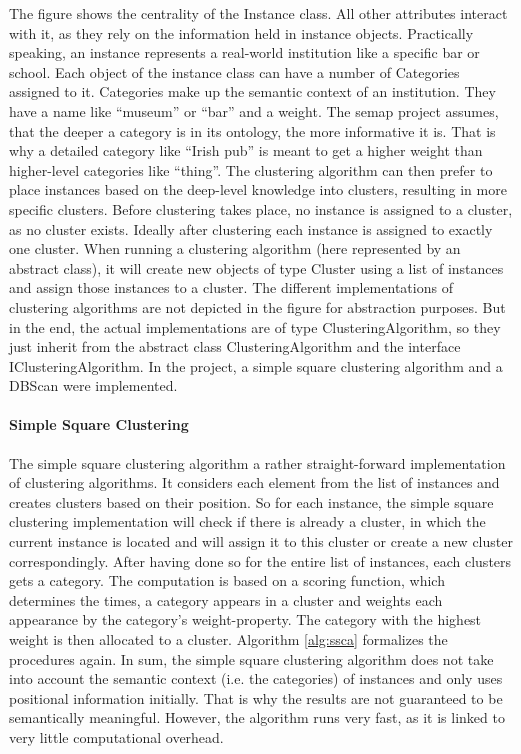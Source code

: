 The figure shows the centrality of the Instance class. All other attributes interact with it, as they rely on the information held in instance objects. Practically speaking, an instance represents a real-world institution like a specific bar or school. Each object of the instance class can have a number of Categories assigned to it. Categories make up the semantic context of an institution. They have a name like “museum” or “bar” and a weight. The semap project assumes, that the deeper a category is in its ontology, the more informative it is. That is why a detailed category like “Irish pub” is meant to get a higher weight than higher-level categories like “thing”. The clustering algorithm can then prefer to place instances based on the deep-level knowledge into clusters, resulting in more specific clusters.
Before clustering takes place, no instance is assigned to a cluster, as no cluster exists. Ideally after clustering each instance is assigned to exactly one cluster. When running a clustering algorithm (here represented by an abstract class), it will create new objects of type Cluster using a list of instances and assign those instances to a cluster. The different implementations of clustering algorithms are not depicted in the figure for abstraction purposes. But in the end, the actual implementations are of type ClusteringAlgorithm, so they just inherit from the abstract class ClusteringAlgorithm and the interface IClusteringAlgorithm. In the project, a simple square clustering algorithm and a DBScan were implemented.


\paragraph{Simple Square Clustering }
The simple square clustering algorithm a rather straight-forward implementation of clustering algorithms. It considers each element from the list of instances and creates clusters based on their position. So for each instance, the simple square clustering implementation will check if there is already a cluster, in which the current instance is located and will assign it to this cluster or create a new cluster correspondingly. After having done so for the entire list of instances, each clusters gets a category. The computation is based on a scoring function, which determines the times, a category appears in a cluster and weights each appearance by the category’s weight-property. The category with the highest weight is then allocated to a cluster. Algorithm \ref{alg:ssca} formalizes the procedures again. In sum, the simple square clustering algorithm does not take into account the semantic context (i.e. the categories) of instances and only uses positional information initially. That is why the results are not guaranteed to be semantically meaningful. However, the algorithm runs very fast, as it is linked to very little computational overhead.


